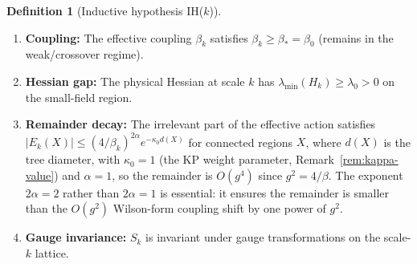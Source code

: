 \documentclass[11pt]{article}
\theoremstyle{definition}
\newtheorem{definition}[theorem]{Definition}
\begin{document}
\begin{definition}[Inductive hypothesis IH($k$)]\label{def:IH}
\begin{enumerate}[nosep,label=(IH\arabic*)]
\item \textbf{Coupling:}
The effective coupling $\beta_k$ satisfies $\beta_k\ge\beta_*=\beta_0$ (remains
in the weak/crossover regime).
\item \textbf{Hessian gap:}
The physical Hessian at scale $k$ has
$\lambda_{\min}(H_k)\ge\lambda_0>0$ on the small-field region.
\item \textbf{Remainder decay:}
The irrelevant part of the effective action satisfies
$|E_k(X)|\le(4/\beta_k)^{2\alpha}e^{-\kappa_0 d(X)}$ for connected
regions $X$, where $d(X)$ is the tree diameter, with $\kappa_0=1$ (the KP weight parameter,
Remark~\ref{rem:kappa-value}) and $\alpha=1$,
so the remainder is $O(g^4)$ since $g^2=4/\beta$.
The exponent $2\alpha=2$ rather than $2\alpha=1$
is essential: it ensures the remainder is smaller than the
$O(g^2)$ Wilson-form coupling shift by one power of $g^2$.
\item \textbf{Gauge invariance:}
$S_k$ is invariant under gauge transformations on the scale-$k$ lattice.
\end{enumerate}
\end{definition}
\end{document}
